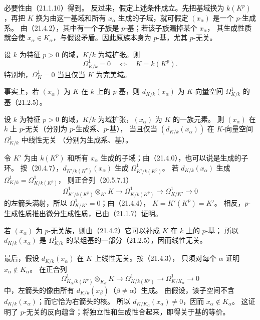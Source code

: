 \eproof
必要性由（21.1.10）得到。
反过来，假定上述条件成立。先把基域换为 $k(K^p)$，再把 $K$ 换为由这一基域和所有
$x_\alpha$ 生成的子域，就可假定 $(x_\alpha)$ 是一个 $p$-生成系。
由（21.4.2），其中有一个子族是 $p$-基；若该子族漏掉某个 $x_\alpha$，
其生成性质就会使 $x_\alpha\in K_\alpha$，与假设矛盾。因此原族本身为 $p$-基，尤其 $p$-无关。
\finishproof

设 $k$ 为特征 $p>0$ 的域，$K/k$ 为域扩张。则
\[
 \Omega^1_{K/k}=0\quad\Longleftrightarrow\quad K=k(K^p).
\]
特别地，$\Omega^1_K=0$ 当且仅当 $K$ 为完美域。

事实上，若 $(x_\alpha)$ 为 $K$ 在 $k$ 上的 $p$-基，则 $d_{K/k}(x_\alpha)$ 为
$K$-向量空间 $\Omega^1_{K/k}$ 的基（21.2.5）。

设 $k$ 为特征 $p>0$ 的域，$K/k$ 为域扩张，$(x_\alpha)$ 为 $K$ 的一族元素。
则 $(x_\alpha)$ 在 $k$ 上 $p$-无关（分别为 $p$-生成系、$p$-基），
当且仅当 $(d_{K/k}(x_\alpha))$ 在 $K$-向量空间 $\Omega^1_{K/k}$ 中线性无关
（分别为生成系、基）。

\eproof
令 $K'$ 为由 $k(K^p)$ 和所有 $x_\alpha$ 生成的子域；由（21.4.0），也可以说是生成的子环。
按（20.4.7），$d_{K'/k(K^p)}(x_\alpha)$ 生成
$\Omega^1_{K'/k(K^p)}$。
若 $d_{K/k}(x_\alpha)$ 生成 $\Omega^1_{K/k}=\Omega^1_{K/k(K^p)}$，
则正合列（20.5.7.1）
\[
 \Omega^1_{K'/k(K^p)}\otimes_{K'}K
 \longrightarrow\Omega^1_{K/k(K^p)}
 \longrightarrow\Omega^1_{K/K'}\longrightarrow0
\]
的左箭头满射，所以 $\Omega^1_{K/K'}=0$；由（21.4.4），
$K=K'(K^p)=K'$。
相反，$p$-生成性质推出微分生成性质，已由（21.1.7）证明。

若 $(x_\alpha)$ 为 $p$-无关族，则由（21.4.2）它可以补成 $K$ 在 $k$ 上的 $p$-基；
所以 $d_{K/k}(x_\alpha)$ 是 $\Omega^1_{K/k}$ 的某组基的一部分（21.2.5），因而线性无关。

最后，假设 $d_{K/k}(x_\alpha)$ 在 $K$ 上线性无关。按（21.4.3），
只须对每个 $\alpha$ 证明 $x_\alpha\notin K_\alpha$。
在正合列
\[
 \Omega^1_{K_\alpha/k(K^p)}\otimes_{K_\alpha}K
 \longrightarrow\Omega^1_{K/k(K^p)}
 \longrightarrow\Omega^1_{K/K_\alpha}\longrightarrow0
\]
中，左箭头的像由所有 $d_{K/k}(x_\beta)$（$\beta\ne\alpha$）生成。
由假设，该子空间不含 $d_{K/k}(x_\alpha)$；而它恰为右箭头的核。
所以 $d_{K/K_\alpha}(x_\alpha)\ne0$，因而 $x_\alpha\notin K_\alpha$。
这证明了 $p$-无关的反向蕴含；将独立性和生成性合起来，即得关于基的等价。
\finishproof

